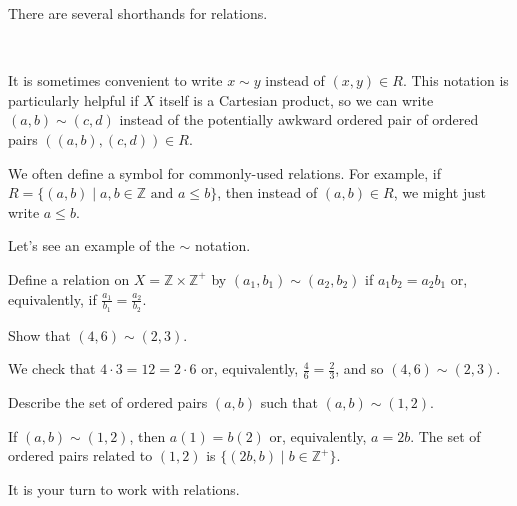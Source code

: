 There are several shorthands for relations.

\begin{rem}
\label{rem_alt_notation_relations}
~
    \begin{apart}
        \item It is sometimes convenient to write $x \sim y$ instead of $(x,y) \in R$.   This notation is particularly helpful if $X$ itself is a Cartesian product, so we can write $(a,b) \sim (c,d) $ instead of the potentially awkward ordered pair of ordered pairs $((a,b),(c,d)) \in R$. 
        \item We often define a symbol for commonly-used relations.  For example, if $R = \{ (a,b) \mid a,b \in \mathbb{Z} \text{ and } a \le b\}$, then instead of $(a,b) \in R$, we might just write $a \le b$.
    \end{apart}
\end{rem}

Let's see an example of the $\sim$ notation.

\begin{exam}
\label{exam_relation_on_cart_prod}
    Define a relation on $X=\mathbb{Z} \times\mathbb{Z}^+$ by $(a_1,b_1) \sim (a_2,b_2)$ if $a_1b_2 = a_2b_1$ or, equivalently, if $\frac{a_1}{b_1}=\frac{a_2}{b_2}$.
        \begin{apart}
            \item Show that $(4,6) \sim (2,3)$.
                \begin{soln}
                    We check that $4 \cdot3 = 12 = 2 \cdot 6$ or, equivalently, $\frac{4}{6}=\frac{2}{3}$, and so $(4,6) \sim (2,3)$.
                \end{soln}
            \item Describe the set of ordered pairs $(a,b)$ such that $(a,b)\sim(1,2)$.
                \begin{soln}
                    If $(a,b)\sim(1,2)$, then $a(1) = b(2)$ or, equivalently, $a=2b$.  The set of ordered pairs related to $(1,2)$ is $\{ (2b,b) \mid b \in \mathbb{Z}^+\}$.
                \end{soln}
        \end{apart}
\end{exam}

It is your turn to work with relations.


